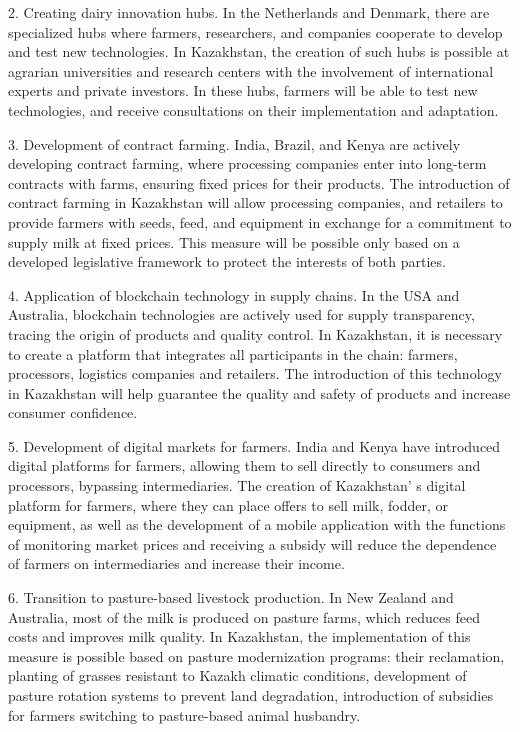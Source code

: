 \begin{multicols}{2}
2. Creating dairy innovation hubs. In the Netherlands and Denmark, there
are specialized hubs where farmers, researchers, and companies
cooperate to develop and test new technologies. In Kazakhstan, the
creation of such hubs is possible at agrarian universities and
research centers with the involvement of international experts and
private investors. In these hubs, farmers will be able to test new
technologies, and receive consultations on their implementation and
adaptation.

3. Development of contract farming. India, Brazil, and Kenya are actively
developing contract farming, where processing companies enter into
long-term contracts with farms, ensuring fixed prices for their
products. The introduction of contract farming in Kazakhstan will
allow processing companies, and retailers to provide farmers with
seeds, feed, and equipment in exchange for a commitment to supply milk
at fixed prices. This measure will be possible only based on a
developed legislative framework to protect the interests of both
parties.

4. Application of blockchain technology in supply chains. In the USA and
Australia, blockchain technologies are actively used for supply
transparency, tracing the origin of products and quality control. In
Kazakhstan, it is necessary to create a platform that integrates all
participants in the chain: farmers, processors, logistics companies
and retailers. The introduction of this technology in Kazakhstan will
help guarantee the quality and safety of products and increase
consumer confidence.

5. Development of digital markets for farmers. India and Kenya have
introduced digital platforms for farmers, allowing them to sell
directly to consumers and processors, bypassing intermediaries. The
creation of Kazakhstan' s digital platform for farmers,
where they can place offers to sell milk, fodder, or equipment, as
well as the development of a mobile application with the functions of
monitoring market prices and receiving a subsidy will reduce the
dependence of farmers on intermediaries and increase their income.

6. Transition to pasture-based livestock production. In New Zealand and
Australia, most of the milk is produced on pasture farms, which
reduces feed costs and improves milk quality. In Kazakhstan, the
implementation of this measure is possible based on pasture
modernization programs: their reclamation, planting of grasses
resistant to Kazakh climatic conditions, development of pasture
rotation systems to prevent land degradation, introduction of
subsidies for farmers switching to pasture-based animal husbandry.


\end{multicols}
